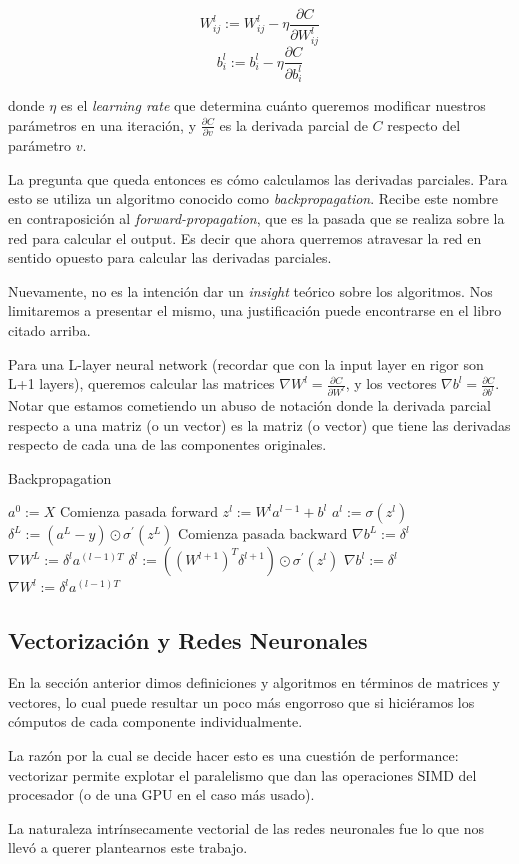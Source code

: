 $$W^l_{ij} := W^l_{ij} - \eta \frac{\partial C}{\partial W^l_{ij}}$$
$$b^l_i := b^l_i - \eta \frac{\partial C}{\partial b^l_i}$$

donde $\eta$ es el \emph{learning rate} que determina cuánto queremos modificar nuestros parámetros en una iteración, y $\frac{\partial C}{\partial v}$ es la derivada parcial de $C$ respecto del parámetro $v$.

La pregunta que queda entonces es cómo calculamos las derivadas parciales. Para esto se utiliza un algoritmo conocido como \emph{backpropagation}. Recibe este nombre en contraposición al \emph{forward-propagation}, que es la pasada que se realiza sobre la red para calcular el output. Es decir que ahora querremos atravesar la red en sentido opuesto para calcular las derivadas parciales.

Nuevamente, no es la intención dar un \emph{insight} teórico sobre los algoritmos. Nos limitaremos a presentar el mismo, una justificación puede encontrarse en el libro citado arriba.

Para una L-layer neural network (recordar que con la input layer en rigor son L+1 layers), queremos calcular las matrices $\nabla W^l = \frac{\partial C}{\partial W^l}$, y los vectores $\nabla b^l = \frac{\partial C}{\partial b^l}$. Notar que estamos cometiendo un abuso de notación donde la derivada parcial respecto a una matriz (o un vector) es la matriz (o vector) que tiene las derivadas respecto de cada una de las componentes originales.

\begin{algorithm}
\caption{Backpropagation}\label{euclid}
\begin{algorithmic}[1]
  \State $a^0 := X$
  \Comment Comienza pasada forward
    \State $z^l := W^l a^{l-1} + b^l$
    \State $a^l := \sigma(z^l)$
  \EndFor 
  \State $\delta^{L} := (a^{L} - y)\odot \sigma^\prime(z^{L})$
  \Comment Comienza pasada backward
  \State $\nabla b^L := \delta^{l}$
  \State $\nabla W^L := \delta^l a^{(l-1)T}$
    \State $\delta^{l} := ((W^{l+1})^T \delta^{l+1}) \odot \sigma^\prime(z^{l})$
    \State $\nabla b^l := \delta^{l}$
    \State $\nabla W^l := \delta^l a^{(l-1)T}$
  \EndFor
\EndProcedure
\end{algorithmic}
\end{algorithm} 

\subsection{Vectorización y Redes Neuronales}

En la sección anterior dimos definiciones y algoritmos en términos de matrices y vectores, lo cual puede resultar un poco más engorroso que si hiciéramos los cómputos de cada componente individualmente. 

La razón por la cual se decide hacer esto es una cuestión de performance: vectorizar permite explotar el paralelismo que dan las operaciones SIMD del procesador (o de una GPU en el caso más usado).

La naturaleza intrínsecamente vectorial de las redes neuronales fue lo que nos llevó a querer plantearnos este trabajo.